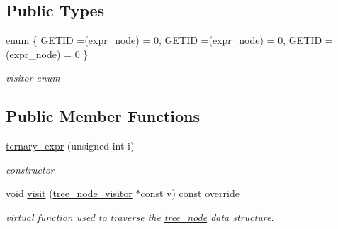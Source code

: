 \subsection*{Public Types}
\begin{DoxyCompactItemize}
\item 
enum \{ \hyperlink{structternary__expr_acd7ceacf5cc8d02da11e025e6525b903a4501d1c41532a35380c674bd24aa269d}{G\+E\+T\+ID} =(expr\+\_\+node) = 0, 
\hyperlink{structternary__expr_acd7ceacf5cc8d02da11e025e6525b903a4501d1c41532a35380c674bd24aa269d}{G\+E\+T\+ID} =(expr\+\_\+node) = 0, 
\hyperlink{structternary__expr_acd7ceacf5cc8d02da11e025e6525b903a4501d1c41532a35380c674bd24aa269d}{G\+E\+T\+ID} =(expr\+\_\+node) = 0
 \}\begin{DoxyCompactList}\small\item\em visitor enum \end{DoxyCompactList}
\end{DoxyCompactItemize}
\subsection*{Public Member Functions}
\begin{DoxyCompactItemize}
\item 
\hyperlink{structternary__expr_a32d011cdfd52c37c58a2adbe58af9790}{ternary\+\_\+expr} (unsigned int i)
\begin{DoxyCompactList}\small\item\em constructor \end{DoxyCompactList}\item 
void \hyperlink{structternary__expr_a3bb8b37b29b4cb797c4872c773184f5b}{visit} (\hyperlink{classtree__node__visitor}{tree\+\_\+node\+\_\+visitor} $\ast$const v) const override
\begin{DoxyCompactList}\small\item\em virtual function used to traverse the \hyperlink{classtree__node}{tree\+\_\+node} data structure. \end{DoxyCompactList}\end{DoxyCompactItemize}
